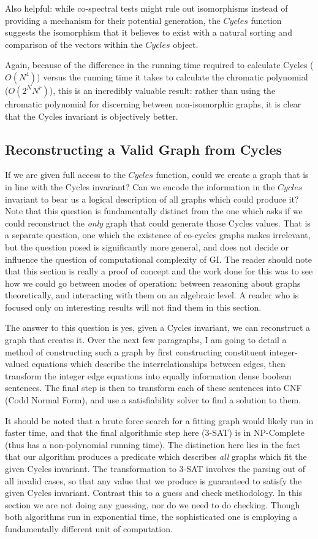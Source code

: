 Also helpful: while co-spectral tests might rule out isomorphisms instead of providing a mechanism for their potential generation, the $Cycles$ function suggests the isomorphism that it believes to exist with a natural sorting and comparison of the vectors within the $Cycles$ object.

Again, because of the difference in the running time required to calculate Cycles ($O(N^4)$) versus the running time it takes to calculate the chromatic polynomial ($O(2^N N^r)$), this is an incredibly valuable result: rather than using the chromatic polynomial for discerning between non-isomorphic graphs, it is clear that the Cycles invariant is objectively better.

\subsection{Reconstructing a Valid Graph from Cycles}
If we are given full access to the $Cycles$ function, could we create a graph that is in line with the Cycles invariant?
Can we encode the information in the $Cycles$ invariant to bear us a logical description of all graphs which could produce it?
Note that this question is fundamentally distinct from the one which asks if we could reconstruct the \emph{only} graph that could generate those Cycles values.
That is a separate question, one which the existence of co-cycles graphs makes irrelevant, but the question posed is significantly more general, and does not decide or influence the question of computational complexity of GI.
The reader should note that this section is really a proof of concept and the work done for this was to see how we could go between modes of operation: between reasoning about graphs theoretically, and interacting with them on an algebraic level.
A reader who is focused only on interesting results will not find them in this section.

The answer to this question is yes, given a Cycles invariant, we can reconstruct a graph that creates it. 
Over the next few paragraphs, I am going to detail a method of constructing such a graph by first constructing constituent integer-valued equations which describe the interrelationships between edges, then transform the integer edge equations into equally information dense boolean sentences. 
The final step is then to transform each of these sentences into CNF (Codd Normal Form), and use a satisfiability solver to find a solution to them.

It should be noted that a brute force search for a fitting graph would likely run in faster time, and that the final algorithmic step here (3-SAT) is in NP-Complete (thus has a non-polynomial running time).
The distinction here lies in the fact that our algorithm produces a predicate which describes \emph{all} graphs which fit the given Cycles invariant.
The transformation to 3-SAT involves the parsing out of all invalid cases, so that any value that we produce is guaranteed to satisfy the given Cycles invariant.
Contrast this to a guess and check methodology.
In this section we are not doing any guessing, nor do we need to do checking.
Though both algorithms run in exponential time, the sophisticated one is employing a fundamentally different unit of computation. 

